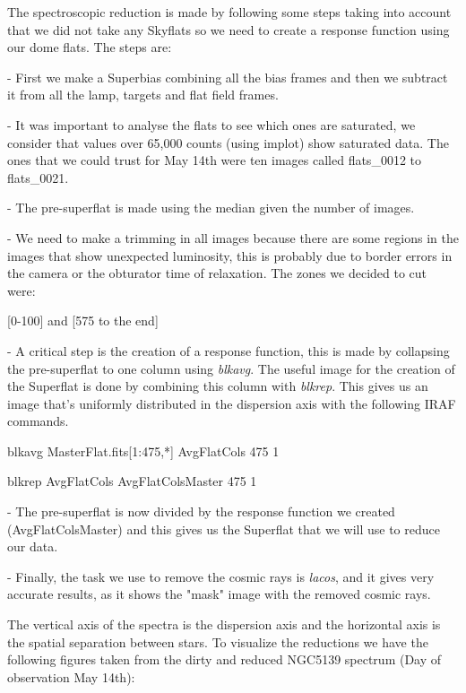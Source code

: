 The spectroscopic reduction is made by following some steps taking into account that we did not take any Skyflats so we need to create a response function using our dome flats. The steps are:

- First we make a Superbias combining all the bias frames and then we subtract it from all the lamp, targets and flat field frames.

- It was important to analyse the flats to see which ones are saturated, we consider that values over 65,000 counts (using implot) show saturated data. The ones that we could trust for May 14th were ten images called flats\_0012 to flats\_0021.

- The pre-superflat is made using the median given the number of images.

- We need to make a trimming in all images because there are some regions in the images that show unexpected luminosity, this is probably due to border errors in the camera or the obturator time of relaxation. The zones we decided to cut were:

[0-100] and [575 to the end]

- A critical step is the creation of a response function, this is made by collapsing the pre-superflat to one column using \textit{blkavg}. The useful image for the creation of the Superflat is done by combining this column with \textit{blkrep}. This gives us an image that's uniformly distributed in the dispersion axis with the following IRAF commands.

blkavg MasterFlat.fits[1:475,*] AvgFlatCols 475 1

blkrep AvgFlatCols AvgFlatColsMaster 475 1

- The pre-superflat is now divided by the response function we created (AvgFlatColsMaster) and this gives us the Superflat that we will use to reduce our data.

- Finally, the task we use to remove the cosmic rays is \textit{lacos}, and it gives very accurate results, as it shows the "mask" image with the removed cosmic rays.

The vertical axis of the spectra is the dispersion axis and the horizontal axis is the spatial separation between stars. To visualize the reductions we have the following figures taken from the dirty and reduced NGC5139 spectrum (Day of observation May 14th):


